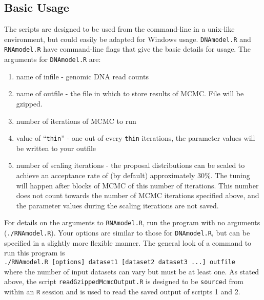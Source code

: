 \documentclass[12pt,]{article}
\begin{document}
\subsection{Basic Usage} \label{basic}
The scripts are designed to be used from the command-line in a unix-like environment,
but could easily be adapted for Windows usage. {\tt DNAmodel.R} and {\tt RNAmodel.R}
have command-line flags that give the basic details for usage. The arguments for
{\tt DNAmodel.R} are:
\begin{enumerate}
\item name of infile - genomic DNA read counts
\item name of outfile - the file in which to store results of MCMC. File will be gzipped.
\item number of iterations of MCMC to run
\item value of ``{\tt thin}'' - one out of every {\tt thin} iterations, the parameter values will be written to 
your outfile
\item number of scaling iterations - the proposal distributions can be scaled to achieve an
acceptance rate of (by default) approximately 30\%. The tuning will happen after blocks of
MCMC of this number of iterations. This number does not count towards the number of
MCMC iterations specified above, and the parameter values during the scaling iterations
are not saved.
\end{enumerate}
For details on the arguments to {\tt RNAmodel.R}, run the program with no arguments 
({\tt ./RNAmodel.R}). Your options are similar to those for {\tt DNAmodel.R}, but can be
specified in a slightly more flexible manner. The general look of a command to run this
program is \\
{\tt ./RNAmodel.R [options] dataset1 [dataset2 dataset3 ...] outfile}\\
where the number of input datasets can vary but must be at least one. As stated above, the
script {\tt readGzippedMcmcOutput.R} is designed to be {\tt source}d from within an {\tt R}
session and is used to read the saved output of scripts 1 and 2.
\end{document}
